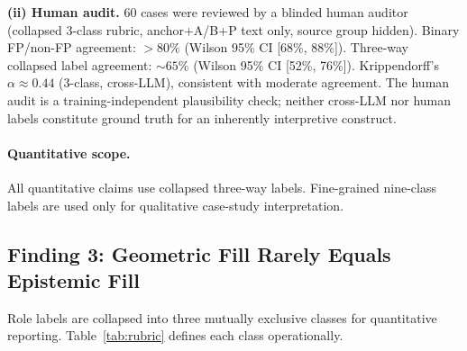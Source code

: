 \documentclass[11pt,twocolumn]{article}
\begin{document}
\textbf{(ii) Human audit.}
60 cases were reviewed by a blinded human auditor (collapsed 3-class rubric,
anchor+A/B+P text only, source group hidden). Binary FP/non-FP agreement: $>80\%$
(Wilson 95\% CI [68\%, 88\%]). Three-way collapsed label agreement: $\sim65\%$
(Wilson 95\% CI [52\%, 76\%]). Krippendorff's $\alpha \approx 0.44$ (3-class, cross-LLM),
consistent with moderate agreement. The human audit is a training-independent
plausibility check; neither cross-LLM nor human labels constitute ground truth for
an inherently interpretive construct.

\begin{table}[h!]
\centering\small
\caption{LLM annotation reliability (t5, n=100). Binary $\kappa$ suppressed by
2\% fill-class imbalance; 3-class $\kappa$ is primary metric.}
\end{table}

\paragraph{Quantitative scope.}
All quantitative claims use collapsed three-way labels. Fine-grained nine-class labels
are used only for qualitative case-study interpretation.

\subsection{Finding 3: Geometric Fill Rarely Equals Epistemic Fill}

Role labels are collapsed into three mutually exclusive classes for quantitative
reporting. Table~\ref{tab:rubric} defines each class operationally.
\end{document}
